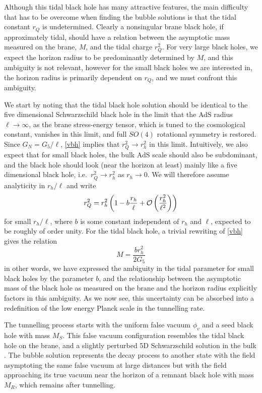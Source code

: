 \documentclass[aps,12pt,prd,superscriptaddress,preprintnumbers, 
	amssymb,
	amsmath,
	notitlepage,
	longbibliography,
	nofootinbib]{revtex4-1}
\newcommand{\be}{\begin{equation}}
\newcommand{\ee}{\end{equation}}
\begin{document}
Although this tidal black hole has many attractive features, the
main difficulty that has to be overcome when finding the bubble 
solutions is that the tidal constant $r_Q$ is undetermined. 
Clearly a nonsingular brane black hole, if approximately tidal,
should have a relation between the asymptotic mass 
measured on the brane, $M$, and the tidal charge $r_Q^2$.
For very large black holes, we expect the horizon radius to be 
predominantly determined by $M$, and this ambiguity is not
relevant, however for the small black holes we are interested in,
the horizon radius is primarily dependent on $r_Q$, and we
must confront this ambiguity.

We start by noting that the tidal black hole solution should be 
identical to the five dimensional Schwarzschild black hole 
in the limit that the AdS radius $\ell\to\infty$, as the brane
stress-energy tensor, which is tuned to the cosmological constant, 
vanishes in this limit, and full $SO(4)$ rotational symmetry is restored. 
Since $G_N=G_5/\ell$, \eqref{vbh} implies that $r_Q^2\to r_h^2$
in this limit. Intuitively, we also expect that for small black holes, the 
bulk AdS scale should also be subdominant, and the black hole should
look (near the horizon at least) mainly like a five dimensional black
hole, i.e.\ $r_Q^2\to r_h^2$ as $r_h\to 0$. We will therefore assume 
analyticity in $r_h/\ell$ and write
\be
r_Q^2=r_h^2\left(1-b{r_h\over\ell}
+ {\cal O} \left({r_h^2\over\ell^2}\right)\right)\label{rq}
\ee
for small $r_h/\ell$, where $b$ is some constant independent of $r_h$
and $\ell$, expected to be roughly of order unity. For the tidal black hole, 
a trivial rewriting of \eqref{vbh} gives the relation
\be
M = \frac{b r_h^2}{2G_5}
\label{mtorh}
\ee
in other words, we have expressed the ambiguity in the tidal parameter 
for small black holes by the parameter $b$, and the relationship 
between the asymptotic mass of the black hole as measured on the brane 
and the horizon radius explicitly factors in this ambiguity. As we now see, 
this uncertainty can be absorbed into a redefinition of the low energy 
Planck scale in the tunnelling rate.

The tunnelling process starts with the uniform false vacuum $\phi_v$ 
and a seed black hole with mass $M_S$. This false vacuum configuration
resembles the tidal black hole on the brane, and a slightly perturbed
5D Schwarzschild solution in the bulk \cite{Kudoh:2003xz}. 
The bubble solution represents the decay process to another state 
with the field asymptoting the same false vacuum at large distances
but with the field approaching its true vacuum near the horizon of a
remnant black hole with mass $M_R$, which remains after tunnelling.
\end{document}
